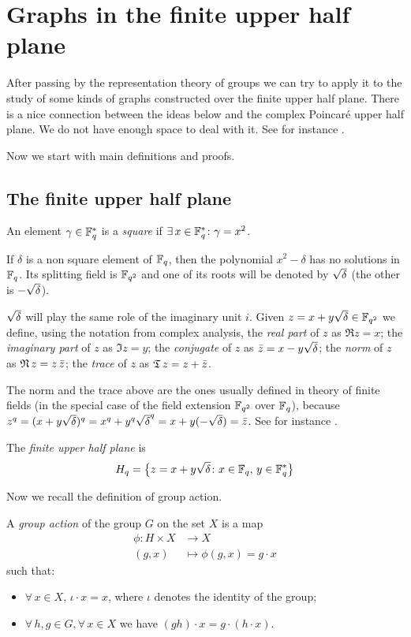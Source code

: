 \section{Graphs in the finite upper half plane}
After passing by the representation theory of groups we can try to apply it to the study of some kinds of graphs constructed
over the finite upper half plane. There is a nice connection between the ideas below and the complex Poincaré upper half plane. We
do not have enough space to deal with it. See for instance \cite{terras_1999}.

Now we start with main definitions and proofs.
\subsection{The finite upper half plane}
\begin{defn}
	An element $\gamma \in {\mathbb F}_q^{*}$ is a {\it square} if $\exists \, x \in {\mathbb F}_q^{*} \colon \gamma = x^2$.
\end{defn}
If $\delta$ is a non square element of ${\mathbb F}_q$, then the polynomial $x^2 - \delta$ has no solutions in ${\mathbb F}_q$.
Its splitting field is ${\mathbb F}_{q^2}$ and one of its roots will be denoted by $\sqrt{\delta}$ (the other is $-\sqrt{\delta}$). 

$\sqrt{\delta}$ will play the same role of the imaginary unit $i$. Given $z=x+y\sqrt{\delta} \in {\mathbb F}_{q^2}$ we define,
using the notation from complex analysis, the {\it real part} of $z$ as $\Re z = x$;
the {\it imaginary part} of $z$ as $\Im z = y$;
the {\it conjugate} of $z$ as $\bar{z} = x-y\sqrt{\delta}$; the {\it norm} of $z$ as $\operatorname{\mathfrak{N}} z = z \, \bar{z}$;
the {\it trace} of $z$ as $\operatorname{\mathfrak{T}} z = z+\bar{z}$.
\begin{rem}
The norm and the trace above are the ones usually defined in theory of finite fields (in the special case of the field 
extension ${\mathbb F}_{q^2}$ over ${\mathbb F}_q$), because $z^q= (x+y\sqrt{\delta})^q = x^q+y^q \sqrt{\delta}^q = x+y(-\sqrt{\delta}) =\bar{z}$.
See for instance \cite{lidl1994introduction}.
\end{rem}
\begin{defn}
	The {\it finite upper half plane} is
	\begin{equation}
		H_q = \big\{ z=x+y \sqrt{\delta} \colon x \in {\mathbb F}_q,\, y \in {\mathbb F}_q^* \big\} 
	\end{equation} 
\end{defn}

Now we recall the definition of group action.
\begin{defn}
  A {\it group action} of the group $G$ on the set $X$ is a map
  \begin{align*}
	\phi \colon H \times X & \longrightarrow X \\ (g,x) &\longmapsto \phi (g,x) = g \cdot x
\end{align*}
such that:
\begin{itemize}
\item $\forall \, x \in X,\, \iota \cdot x = x$, where $\iota$ denotes the identity of the group;
\item $\forall \, h,g \in G, \forall\, x \in X$ we have $(gh)\cdot x=g \cdot (h\cdot x)$.
\end{itemize} 
\end{defn}


